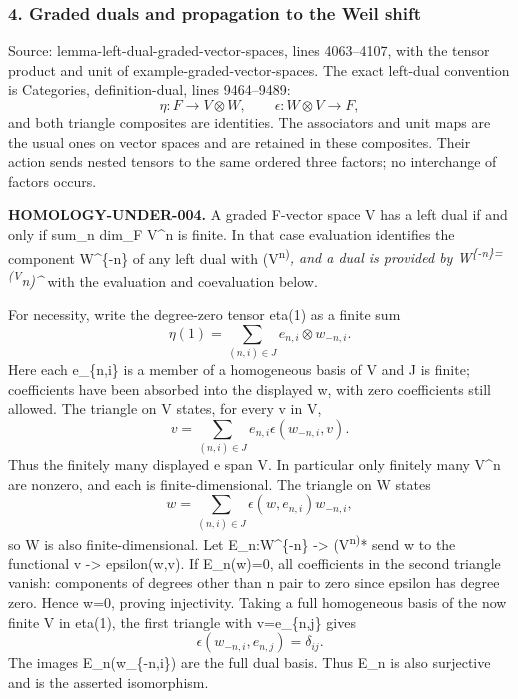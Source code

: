 \subsubsection{4. Graded duals and propagation to the Weil shift}\label{graded-duals-and-propagation-to-the-weil-shift}

Source: lemma-left-dual-graded-vector-spaces, lines 4063--4107, with the tensor product and unit of example-graded-vector-spaces. The exact left-dual convention is Categories, definition-dual, lines 9464--9489: \[
\eta:F\longrightarrow V\otimes W,\qquad
\epsilon:W\otimes V\longrightarrow F,
\] and both triangle composites are identities. The associators and unit maps are the usual ones on vector spaces and are retained in these composites. Their action sends nested tensors to the same ordered three factors; no interchange of factors occurs.

\textbf{HOMOLOGY-UNDER-004.} A graded F-vector space V has a left dual if and only if sum\_n dim\_F V\^{}n is finite. In that case evaluation identifies the component W\^{}\{-n\} of any left dual with (V\textsuperscript{n)}\emph{, and a dual is provided by W\textsuperscript{\{-n\}=(V}n)\^{}} with the evaluation and coevaluation below.

For necessity, write the degree-zero tensor eta(1) as a finite sum \[
\eta(1)=\sum_{(n,i)\in J} e_{n,i}\otimes w_{-n,i}.
\] Here each e\_\{n,i\} is a member of a homogeneous basis of V and J is finite; coefficients have been absorbed into the displayed w, with zero coefficients still allowed. The triangle on V states, for every v in V, \[
v=\sum_{(n,i)\in J}e_{n,i}\epsilon(w_{-n,i},v).
\] Thus the finitely many displayed e span V. In particular only finitely many V\^{}n are nonzero, and each is finite-dimensional. The triangle on W states \[
w=\sum_{(n,i)\in J}\epsilon(w,e_{n,i})w_{-n,i},
\] so W is also finite-dimensional. Let E\_n:W\^{}\{-n\} -\textgreater{} (V\textsuperscript{n)}* send w to the functional v -\textgreater{} epsilon(w,v). If E\_n(w)=0, all coefficients in the second triangle vanish: components of degrees other than n pair to zero since epsilon has degree zero. Hence w=0, proving injectivity. Taking a full homogeneous basis of the now finite V in eta(1), the first triangle with v=e\_\{n,j\} gives \[
\epsilon(w_{-n,i},e_{n,j})=\delta_{ij}.
\] The images E\_n(w\_\{-n,i\}) are the full dual basis. Thus E\_n is also surjective and is the asserted isomorphism.

